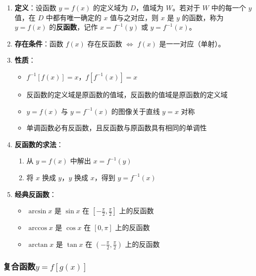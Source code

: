 \documentclass[../book.tex]{subfiles}
\begin{document}
    \begin{enumerate}
        \item \textbf{定义}：设函数 $y = f(x)$ 的定义域为 $D$，值域为 $W$。若对于 $W$ 中的每一个 $y$ 值，在 $D$ 中都有唯一确定的 $x$ 值与之对应，则 $x$ 是 $y$ 的函数，称为 $y = f(x)$ 的\textbf{反函数}，记作 $x = f^{-1}(y)$ 或 $y = f^{-1}(x)$。

        \item \textbf{存在条件}：函数 $f(x)$ 存在反函数 $\Leftrightarrow$ $f(x)$ 是一一对应（单射）。

        \item \textbf{性质}：
        \begin{itemize}
            \item $f^{-1}[f(x)] = x$，$f[f^{-1}(x)] = x$
            \item 反函数的定义域是原函数的值域，反函数的值域是原函数的定义域
            \item $y = f(x)$ 与 $y = f^{-1}(x)$ 的图像关于直线 $y = x$ 对称
            \item 单调函数必有反函数，且反函数与原函数具有相同的单调性
        \end{itemize}

        \item \textbf{反函数的求法}：
        \begin{enumerate}
            \item 从 $y = f(x)$ 中解出 $x = f^{-1}(y)$
            \item 将 $x$ 换成 $y$，$y$ 换成 $x$，得到 $y = f^{-1}(x)$
        \end{enumerate}

        \item \textbf{经典反函数}：
        \begin{itemize}
            \item $\arcsin x$ 是 $\sin x$ 在 $[-\frac{\pi}{2}, \frac{\pi}{2}]$ 上的反函数
            \item $\arccos x$ 是 $\cos x$ 在 $[0, \pi]$ 上的反函数
            \item $\arctan x$ 是 $\tan x$ 在 $(-\frac{\pi}{2}, \frac{\pi}{2})$ 上的反函数
        \end{itemize}
    \end{enumerate}

    \subsubsection{复合函数$y = f[g(x)]$}
\end{document}
